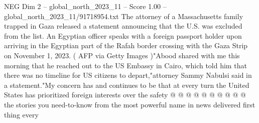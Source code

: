 \begin{textsample}{NEG Dim 2 – global\_north\_2023\_11 – Score 1.00 – global\_north\_2023\_11/91718954.txt}
The attorney of a Massachusetts family trapped in Gaza released a statement announcing that the U.S. was excluded from the list.
An Egyptian officer speaks with a foreign passport holder upon arriving in the Egyptian part of the Rafah border crossing with the Gaza Strip on November 1, 2023. ( AFP via Getty Images )"Abood shared with me this morning that he reached out to the US Embassy in Cairo, which told him that there was no timeline for US citizens to depart,"attorney Sammy Nabulsi said in a statement."My concern has and continues to be that at every turn the United States has prioritized foreign interests over the safety @ @ @ @ @ @ @ @ @ @ the stories you need-to-know from the most powerful name in news delivered first thing every

\end{textsample}
